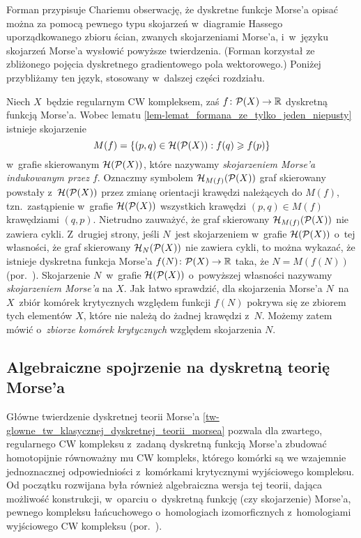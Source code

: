 Forman \cite{Forman02} przypisuje Chariemu \cite{Chari00}  obserwację, że dyskretne funkcje Morse'a opisać można za pomocą pewnego typu skojarzeń w~diagramie Hassego uporządkowanego zbioru ścian, zwanych skojarzeniami Morse'a, i~w~języku skojarzeń Morse'a wysłowić powyższe twierdzenia. (Forman \cite{Forman98} korzystał ze zbliżonego pojęcia dyskretnego gradientowego pola wektorowego.) Poniżej przybliżamy ten język, stosowany w~dalszej części rozdziału.

Niech $X$~będzie regularnym CW kompleksem, zaś $f\colon \mathcal{P}(X)\to \mathbb{R}$ dyskretną funkcją Morse'a. Wobec lematu \ref{lem-lemat_formana_ze_tylko_jeden_niepusty} istnieje skojarzenie \[M(f)=\{(p,q)\in \mathcal{H}(\mathcal{P}(X)):f(q)\geqslant f(p)\}\] w~grafie skierowanym $\mathcal{H}(\mathcal{P}(X))$, które nazywamy \textit{skojarzeniem Morse'a indukowanym przez $f$}. Oznaczmy symbolem $\mathcal{H}_{M(f)}(\mathcal{P}(X))$ graf skierowany powstały z~$\mathcal{H}(\mathcal{P}(X))$ przez zmianę orientacji krawędzi należących do $M(f)$, tzn.~zastąpienie w~grafie $\mathcal{H}(\mathcal{P}(X))$ wszystkich krawędzi $(p,q)\in M(f)$ krawędziami $(q,p)$. Nietrudno zauważyć, że graf skierowany $\mathcal{H}_{M(f)}(\mathcal{P}(X))$ nie zawiera cykli. Z~drugiej strony, jeśli $N$~jest skojarzeniem w~grafie $\mathcal{H}(\mathcal{P}(X))$ o~tej własności, że graf skierowany $\mathcal{H}_N(\mathcal{P}(X))$ nie zawiera cykli, to można wykazać, że istnieje dyskretna funkcja Morse'a $f(N)\colon \mathcal{P}(X)\to \mathbb{R}$ taka, że $N=M(f(N))$ (por.~\cite[Theorem 3.6]{Forman02}). Skojarzenie $N$~w~grafie $\mathcal{H}(\mathcal{P}(X))$ o~powyższej własności nazywamy \textit{skojarzeniem Morse'a} na $X$. Jak łatwo sprawdzić, dla skojarzenia Morse'a $N$~na $X$~zbiór komórek krytycznych względem funkcji $f(N)$ pokrywa się ze zbiorem tych elementów $X$, które nie należą do żadnej krawędzi z~$N$. Możemy zatem mówić o~\textit{zbiorze komórek krytycznych} względem skojarzenia $N$.

\subsection{Algebraiczne spojrzenie na dyskretną teorię Morse'a}\label{subsec-homol_dysk_teo_mors}
Główne twierdzenie dyskretnej teorii Morse'a \ref{tw-glowne_tw_klasycznej_dyskretnej_teorii_morsea} pozwala dla zwartego, regularnego CW kompleksu z~zadaną dyskretną funkcją Morse'a zbudować homotopijnie równoważny mu CW kompleks, którego komórki są we wzajemnie jednoznacznej odpowiedniości z~komórkami krytycznymi wyjściowego kompleksu. Od początku rozwijana była również algebraiczna wersja tej teorii, dająca możliwość konstrukcji, w~oparciu o~dyskretną funkcję (czy skojarzenie) Morse'a, pewnego kompleksu łańcuchowego o~homologiach izomorficznych z~homologiami wyjściowego CW kompleksu (por.~\cite{Forman98}).

